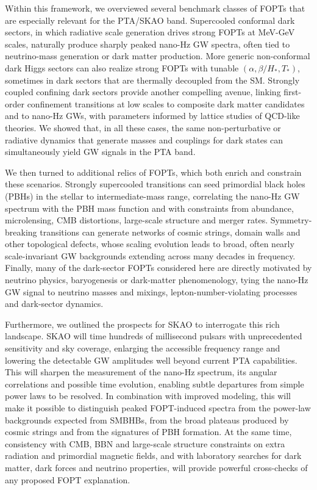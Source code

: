 \documentclass[a4paper,11pt]{article}
\begin{document}
Within this framework, we overviewed several benchmark classes of FOPTs that are especially relevant for the PTA/SKAO band.
Supercooled conformal dark sectors, in which radiative scale generation drives strong FOPTs at MeV-GeV scales, naturally 
produce sharply peaked nano-Hz GW spectra, often tied to neutrino-mass generation or dark matter production. More generic 
non-conformal dark Higgs sectors can also realize strong FOPTs with tunable $(\alpha,\beta/H_*,T_*)$, sometimes in dark 
sectors that are thermally decoupled from the SM. Strongly coupled confining dark sectors provide another compelling 
avenue, linking first-order confinement transitions at low scales to composite dark matter candidates and to nano-Hz GWs, 
with parameters informed by lattice studies of QCD-like theories. We showed that, in all these cases, the same 
non-perturbative or radiative dynamics that generate masses and couplings for dark states can simultaneously yield 
GW signals in the PTA band.

We then turned to additional relics of FOPTs, which both enrich and constrain these scenarios. Strongly supercooled 
transitions can seed primordial black holes (PBHs) in the stellar to intermediate-mass range, correlating the nano-Hz GW
spectrum with the PBH mass function and with constraints from abundance, microlensing, CMB distortions, large-scale structure 
and merger rates. Symmetry-breaking transitions can generate networks of cosmic strings, domain walls and other topological
defects, whose scaling evolution leads to broad, often nearly scale-invariant GW backgrounds extending across many decades 
in frequency. Finally, many of the dark-sector FOPTs considered here are directly motivated by neutrino physics, baryogenesis 
or dark-matter phenomenology, tying the nano-Hz GW signal to neutrino masses and mixings, lepton-number-violating processes 
and dark-sector dynamics.

Furthermore, we outlined the prospects for SKAO to interrogate this rich landscape. SKAO will time hundreds of millisecond
pulsars with unprecedented sensitivity and sky coverage, enlarging the accessible frequency range and lowering the detectable 
GW amplitudes well beyond current PTA capabilities. This will sharpen the measurement of the nano-Hz spectrum, its angular
correlations and possible time evolution, enabling subtle departures from simple power laws to be resolved. In combination 
with improved modeling, this will make it possible to distinguish peaked FOPT-induced spectra from the power-law backgrounds
expected from SMBHBs, from the broad plateaus produced by cosmic strings and from the signatures of PBH formation. At the same
time, consistency with CMB, BBN and large-scale structure constraints on extra radiation and primordial magnetic fields, 
and with laboratory searches for dark matter, dark forces and neutrino properties, will provide powerful cross-checks 
of any proposed FOPT explanation.
\end{document}
